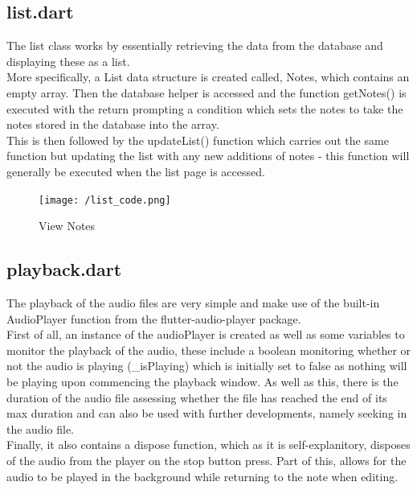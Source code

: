\documentclass[oneside]{report}
\begin{document}

		\subsection{list.dart}
		The list class works by essentially retrieving the data from the database and displaying these as a list.\\

More specifically, a List data structure is created called, Notes, which contains an empty array. Then the database helper is accessed and the function getNotes() is executed with the return prompting a condition which sets the notes to take the notes stored in the database into the array.\\

This is then followed by the updateList() function which carries out the same function but updating the list with any new additions of notes - this function will generally be executed when the list page is accessed.
		\begin{figure}[H]
			\begin{center}
	 		 	\texttt{[image: /list\_code.png]}
			\end{center}
			\caption[View Notes]{View Notes}
		\end{figure}


		\subsection{playback.dart}
		The playback of the audio files are very simple and make use of the built-in AudioPlayer function from the flutter-audio-player package. \\

First of all, an instance of the audioPlayer is created as well as some variables to monitor the playback of the audio, these include a boolean monitoring whether or not the audio is playing (\_isPlaying) which is initially set to false as nothing will be playing upon commencing the playback window. As well as this, there is the duration of the audio file assessing whether the file has reached the end of its max duration and can also be used with further developments, namely seeking in the audio file.\\

Finally, it also contains a dispose function, which as it is self-explanitory, disposes of the audio from the player on the stop button press. Part of this, allows for the audio to be played in the background while returning to the note when editing. 
\end{document}
